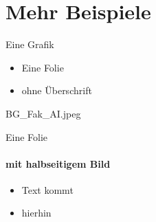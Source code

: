 \documentclass[t,
aspectratio=169,  %
]{beamer}
\begin{document}
\section{Mehr Beispiele}

\begin{frame}{Eine Grafik}
	\begin{center}
	\end{center}
\end{frame}

\begin{frame}{}
	\begin{itemize}
		\item Eine Folie
		\item ohne Überschrift
	\end{itemize}
\end{frame}

\begin{halfpage}{BG_Fak_AI.jpeg}
\begin{frame}{Eine Folie}
	\framesubtitle{mit halbseitigem Bild}
	\begin{itemize}
		\item Text kommt
		\item hierhin
	\end{itemize}
\end{frame}
\end{halfpage}
\end{document}
